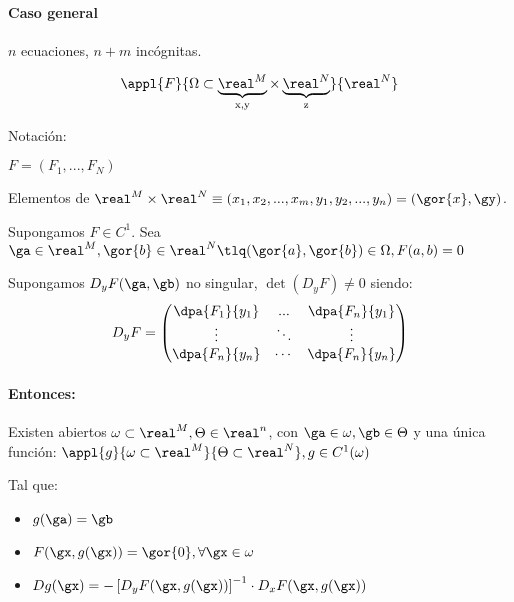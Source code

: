 \documentclass{apuntes}
\begin{document}
\paragraph{Caso general}
\begin{theorem}

$n$ ecuaciones, $n+m$ incógnitas.

$$\appl{F}{\Omega\subset\underbrace{\real^M}_{\text{x,y}} \times \underbrace{\real^N}_{\text{z}}}{\real^N}$$

Notación:

$F = (F_1,...,F_N)$

Elementos de $\real^M\times\real^N \equiv (x_1,x_2,...,x_m,y_1,y_2,...,y_n) = (\gor{x},\gy)$.

Supongamos $F\in C^1$. Sea $\ga \in \real^M, \gor{b} \in \real^N \tlq (\gor{a},\gor{b})\in \Omega , F(a,b)=0$

Supongamos $D_yF(\ga,\gb)$ no singular, $\det(D_yF)\neq 0$ siendo:
$$D_yF = \begin{pmatrix}
          \dpa{F_1}{y_1}&...&\dpa{F_n}{y_1}\\
          \vdots&\ddots&\vdots\\
          \dpa{F_n}{y_n}&\cdots&\dpa{F_n}{y_n}
         \end{pmatrix}$$
         
\paragraph{Entonces:} Existen abiertos $\omega \subset \real^M, \Theta \in\real^n$, con $\ga \in \omega, \gb \in \Theta$ y una única función: $\appl{g}{\omega\subset\real^M}{\Theta \subset\real^N}, g\in C^1(\omega)$

Tal que:
\begin{itemize}
 \item $g(\ga) = \gb$
 \item $F(\gx,g(\gx)) = \gor{0}, \forall \gx \in \omega$
 \item $\displaystyle Dg(\gx) = - \left[D_yF(\gx,g(\gx))\right]^{-1} \cdot D_xF(\gx,g(\gx))$
\end{itemize}
\end{theorem}
\end{document}
